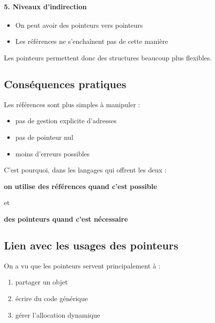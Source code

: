\paragraph{5. Niveaux d’indirection}

\begin{itemize}
    \item On peut avoir des pointeurs vers pointeurs
    \item Les références ne s’enchaînent pas de cette manière
\end{itemize}

Les pointeurs permettent donc des structures beaucoup plus flexibles.

\subsection{Conséquences pratiques}

Les références sont plus simples à manipuler :

\begin{itemize}
    \item pas de gestion explicite d’adresses
    \item pas de pointeur nul
    \item moins d’erreurs possibles
\end{itemize}

C’est pourquoi, dans les langages qui offrent les deux :

\begin{center}
\textbf{on utilise des références quand c’est possible}
\end{center}

et

\begin{center}
\textbf{des pointeurs quand c’est nécessaire}
\end{center}

\subsection{Lien avec les usages des pointeurs}

On a vu que les pointeurs servent principalement à :

\begin{enumerate}
    \item partager un objet
    \item écrire du code générique
    \item gérer l’allocation dynamique
\end{enumerate}

